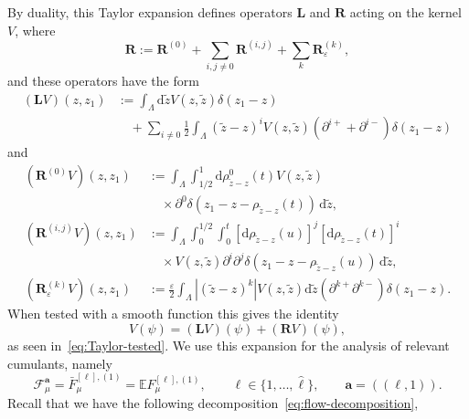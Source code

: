 \documentclass{article}
\numberwithin{equation}{section}
\newcommand{\assign}{:=}
\newcommand{\mathd}{\mathrm{d}}
\theoremstyle{plain}
\theoremstyle{definition}
\begin{document}
By duality, this Taylor expansion defines operators $\boldsymbol{L}$ and
$\boldsymbol{R}$ acting on the kernel $V$, where
\begin{equation}
  \boldsymbol{R} \assign \boldsymbol{R}^{(0)} + \sum_{i, j \neq 0}
  \boldsymbol{R}^{(i, j)} + \sum_k \boldsymbol{R}_{\varepsilon}^{(k)},
  \label{eq:decomposition-of-R}
\end{equation}
and these operators have the form
\begin{equation}
  \begin{aligned}
    (\boldsymbol{L} V) (z, z_1)
    &\assign \int_{\Lambda} \mathd \tilde{z} V
    (z, \tilde{z})  \delta (z_1 - z)\\
    &\quad + \sum_{i \neq 0}
    \frac{1}{2} \int_{\Lambda} (\tilde{z} - z)^i V (z, \tilde{z} )
    (\partial^{i+}  + \partial^{i-}) \delta (z_1 - z)
  \end{aligned} \label{eq:L-operator}
\end{equation}
and
\begin{equation}
  \begin{aligned}
    (\boldsymbol{R}^{(0)} V) (z, z_1)
    &\assign \int_{\Lambda} \int_{1 / 2}^1
    \mathd \rho_{\tilde{z} - z}^0 (t) V (z, \tilde{z})\\
    &\quad \times \partial^0 \delta (z_1
    - z - \rho_{\tilde{z} - z} (t))\,\mathd \tilde{z},\\
    (\boldsymbol{R}^{(i, j)} V) (z, z_1)
    &\assign \int_{\Lambda}
    \int_0^{1 / 2} \int_0^t  [\mathd \rho _{\tilde{z} - z} (u)]^j
    [\mathd \rho_{\tilde{z} - z} (t)]^i\\
    &\quad \times V (z, \tilde{z}) \partial^i \partial^j
    \delta (z_1 - z - \rho_{\tilde{z} - z} (u))\,\mathd \tilde{z},\\
    (\boldsymbol{R}_{\varepsilon}^{(k)} V) (z, z_1)
    &\assign 
    \frac{\varepsilon}{2} \int_{\Lambda}  |(\tilde{z} - z)^k| V (z, \tilde{z})
    \mathd \tilde{z}  (\partial^{k+}  \partial^{k-}) \delta (z_1 - z) .
  \end{aligned} \label{eq:R-operators}
\end{equation}
When tested with a smooth function this gives the identity
\[ V (\psi) = (\boldsymbol{L} V) (\psi) + (\boldsymbol{R} V) (\psi), \]
as seen in~\eqref{eq:Taylor-tested}. We use this expansion for the analysis of
relevant cumulants, namely
\[ \mathcal{F}^{\boldsymbol{a}}_{\mu} = \bar{F}_{\mu}^{[\ell], (1)}
   =\mathbb{E}F_{\mu}^{[\ell], (1)}, \qquad \ell \in \{ 1, \ldots, \hat{\ell}
   \} , \qquad \boldsymbol{a} = ((\ell, 1)). \]
Recall that we have the following decomposition~\eqref{eq:flow-decomposition},
\end{document}
